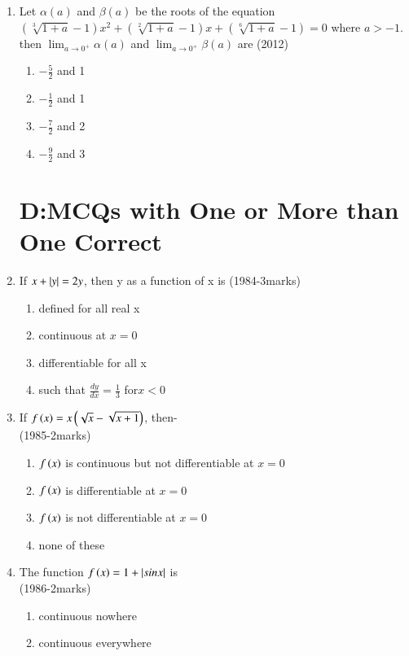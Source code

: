 \documentclass[journal,12pt,twocolumn]{IEEEtran}
\theoremstyle{remark}
\begin{document}
\begin{enumerate}
\begin{enumerate}
		\end{enumerate}
	\item Let $\alpha(a)$ and $\beta(a)$ be the roots of the equation $(\sqrt[3]{1+a}-1)x^2+(\sqrt[2]{1+a}-1)x+(\sqrt[6]{1+a}-1)=0$ where $a>-1$. then $\lim_{a \to 0^+}{\alpha(a)}$ and $\lim_{a \to 0^+}{\beta(a)}$ are \hfill{(2012)}
		\begin{enumerate}
			\item $-\frac{5}{2}$ and 1
			\item $-\frac{1}{2}$ and 1
			\item $-\frac{7}{2}$ and 2
			\item $-\frac{9}{2}$ and 3 \\
		\end{enumerate}
\section{D:MCQs with One or More than One Correct}
	\item If $x+\left\vert y\right\vert=2y$, then y as a function of x is \hfill{(1984-3marks)}
		\begin{enumerate}
			\item defined for all real x
			\item continuous at $x=0$
			\item differentiable for all x
			\item such that $\frac{dy}{dx}=\frac{1}{3}$ for$x<0$ \\
		\end{enumerate}
	\item If $f\left(x\right)=x\left(\sqrt{x}-\sqrt{x+1}\right)$, then- \\ \hfill{(1985-2marks)}
		\begin{enumerate}
			\item $f\left(x\right)$ is continuous but not differentiable at $x=0$
			\item $f\left(x\right)$ is differentiable at $x=0$
			\item $f\left(x\right)$ is not differentiable at $x=0$
			\item none of these \\
		\end{enumerate}
	\item The function $f\left(x\right)=1+\left\vert sinx\right\vert$ is \\ \hfill{(1986-2marks)}
		\begin{enumerate}
			\item continuous nowhere
			\item continuous everywhere

\end{enumerate}
\end{enumerate}
\end{document}
